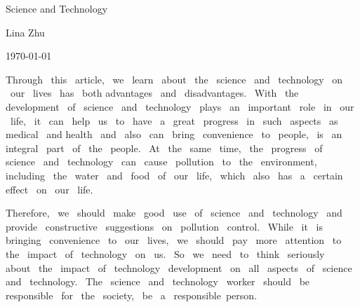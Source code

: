 \documentclass{article}
\begin{document}
	
	
	
	\begin{center}
		
		Science and Technology
	\end{center}
	\begin{center}
	Lina Zhu
	\end{center}
	\begin{center}
		\today
	\end{center}
	
	\par Through~ this ~article,~ we ~learn~ about ~the~ science~ and~ technology ~on ~our~ lives~ has~ both advantages ~and ~disadvantages.~ With~ the~ development~ of~ science ~and~ technology~ plays ~an ~important~ role~ in~ our ~life,~ it~ can ~help~ us ~to~ have~ a ~great~ progress~ in~ such ~aspects~ as~ medical~ and health~ and~ also~ can~ bring~ convenience~ to~ people,~ is~ an~ integral~ part~ of~ the~ people.~ At~ the~ same~ time,~ the~ progress~ of~ science~ and~ technology~ can~ cause~ pollution~ to~ the~ environment,~ including~ the~ water~ and~ food~ of~ our~ life,~ which~ also~ has~ a ~certain~ effect~ on~ our~ life.~
	\par Therefore,~ we~ should~ make~ good~ use~ of~ science~ and~ technology ~and~ provide~ constructive~ suggestions~ on~ pollution~ control.~ While~ it~ is~ bringing~ convenience~ to~ our~ lives,~ we~ should~ pay~ more~ attention~ to~ the~ impact~ of~ technology~ on~ us.~ So~ we~ need~ to~ think~ seriously~ about~ the~ impact~ of~ technology~ development~ on~ all~ aspects~ of~ science~ and~ technology.~ The~ science~ and~ technology~ worker~ should~ be~ responsible~ for~ the~ society,~ be~ a~ responsible~person.
	
\end{document}
